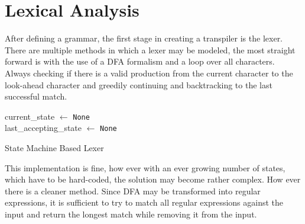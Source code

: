 


\section{Lexical Analysis}
After defining a grammar, the first stage in creating a transpiler is the lexer. There are multiple methods in which a lexer may be modeled, the most straight forward is with the use of a DFA formalism and a loop over all characters. Always checking if there is a valid production from the current character to the look-ahead character and greedily continuing and backtracking to the last successful match. 


\begin{algorithm}[H]

current\_state $\gets$ \texttt{None}\\
last\_accepting\_state $\gets$ \texttt{None}

    


\caption{State Machine Based Lexer}
\label{alg:lexer}
\end{algorithm}

This implementation is fine, how ever with an ever growing number of states, which have to be hard-coded, the solution may become rather complex. How ever there is a cleaner method. Since DFA may be transformed into regular expressions, it is sufficient to try to match all regular expressions against the input and return the longest match while removing it from the input.


